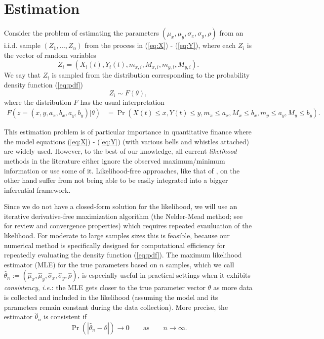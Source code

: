 \documentclass[10pt]{article}
\begin{document}
\section{Estimation}
Consider the problem of estimating the parameters
$(\mu_x, \mu_y, \sigma_x, \sigma_y, \rho)$ from an i.i.d. sample
$(Z_1, \ldots, Z_n)$ from the process in (\ref{eq:X}) - (\ref{eq:Y}),
where each $Z_i$ is the vector of random variables
\[
  Z_i = (X_i(t), Y_i(t), m_{x,i}, M_{x,i}, m_{y,i}, M_{y,i}).
\]
We say that $Z_i$ is sampled from the distribution corresponding to
the probability density function (\ref{eq:pdf})
\[
  Z_i \sim F(\theta),
\]
where the distribution $F$ has the usual interpretation
\begin{align*}
  F(z = (x, y, a_x, b_x, a_y, b_y) | \theta) &= \Pr\left(X(t) \leq x,
    Y(t) \leq y, m_x \leq a_x, M_x \leq b_x, m_y \leq a_y, M_y \leq b_y\right).
\end{align*}

This estimation problem is of particular importance in quantitative
finance where the model equations (\ref{eq:X}) - (\ref{eq:Y}) (with
various bells and whistles attached) are widely used. However, to the
best of our knowledge, all current \textit{likelihood} methods in the
literature either ignore the observed maximum/minimum information or
use some of it. Likelihood-free approaches, like that of
\cite{rogers1991estimating}, on the other hand suffer from not being
able to be easily integrated into a bigger inferential framework.

Since we do not have a closed-form solution for the likelihood, we
will use an iterative derivative-free maximization algorithm (the
Nelder-Mead method; see \cite{lagarias1998convergence} for review and
convergence properties) which requires repeated evauluation of the
likelihood. For moderate to large samples sizes this is feasible,
because our numerical method is specifically designed for
computational efficiency for repeatedly evaluating the density
function (\ref{eq:pdf}). The maximum likelihood estimator (MLE) for
the true parameters based on $n$ samples, which we call
$\hat{\theta}_n := (\hat{\mu}_x, \hat{\mu}_y, \hat{\sigma}_x,
\hat{\sigma}_y, \hat{\rho})$, is especially useful in practical
settings when it exhibits \textit{consistency}, \textit{i.e.}: the MLE
gets closer to the true parameter vector $\theta$ as more data is
collected and included in the likelihood (assuming the model and its
parameters remain constant during the data collection). More
precise, the estimator $\hat{\theta}_n$ is consistent if
\[
  \Pr( | \hat{\theta}_n - \theta | ) \to 0 \qquad \mbox{as} \qquad n \to \infty.
\]
\end{document}
